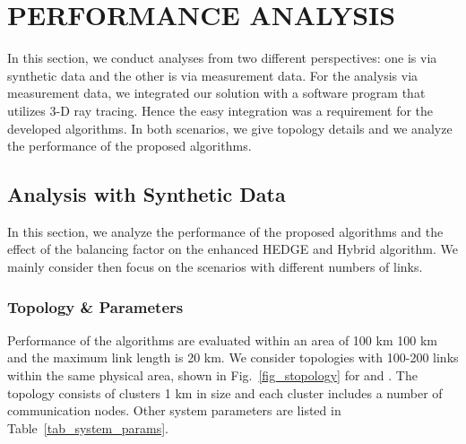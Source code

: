 \documentclass[10pt,twocolumn,twoside]{JCNtran}
\newcommand{\tbirkan}[1]{#1}
\begin{document}
\begin{figure*}[!t]
\begin{center}
\end{center}
\caption{Topology for analysis with synthetic data in a 100 km  100 km region. Each shown link has two-way communication links (i.e., each link in the figure corresponds to two links in the system model). For  case, there are additionally 50 links, represented with different colors and line style (dashed). Red circles indicate the clusters of communication node locations.}
\label{fig_stopology}
\end{figure*}
\section{\uppercase{Performance Analysis}}
\label{sec_performance_analysis}
In this section, we conduct analyses from two different perspectives: one is via synthetic data and the other is via measurement data. For the analysis via measurement data, we integrated our solution with a software program that utilizes 3-D ray tracing. \tbirkan{Hence the easy integration was a requirement for the developed algorithms}. In both scenarios, we give topology details and we analyze the performance of the proposed algorithms. 


\subsection{Analysis with Synthetic Data}
In this section, we analyze the performance of the proposed algorithms and the effect of the balancing factor on the enhanced HEDGE and Hybrid algorithm. We \tbirkan{mainly consider } then focus on the scenarios with different numbers of links.

\subsubsection{Topology \& Parameters}
\label{subsec_topology_and_parameters}
Performance of the algorithms are evaluated within an area of 100 km  100 km and the maximum link length is 20 km. We consider topologies with 100-200 links within the same physical area, shown in Fig.~\ref{fig_stopology} for  and . The topology consists of clusters 1 km in size and each cluster includes a number of communication nodes. Other system parameters are listed in Table~\ref{tab_system_params}.
\end{document}

